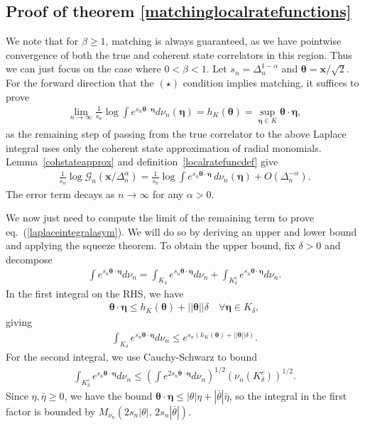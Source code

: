 \documentclass[a4paper,11pt]{article}
\theoremstyle{plain}
\theoremstyle{definition}
\theoremstyle{remark}
\newcommand{\bs}[1]{\boldsymbol{#1}}
\newcommand{\ba}{\begin{equation} \begin{aligned}}
\newcommand{\ea}{\end{aligned} \end{equation}}
\newcommand{\De}{\Delta}
\begin{document}
\begin{appendix}
\section{Proof of theorem \ref{matchinglocalratefunctions}}
\label{proofofmatchinglocalratefunctions}

We note that for $\beta \geq1$, matching is always guaranteed, as we have pointwise convergence of both the true and coherent state correlators in this region. Thus we can just focus on the case where $0<\beta<1$. Let $s_n = \De_n^{1-\alpha}$ and $\bs{\theta} = \bs{x}/\sqrt{2}$. For the forward direction that the $(\star)$ condition implies matching, it suffices to prove
\ba
\lim_{n\to\infty} \frac{1}{s_n} \log \int e^{s_n \bs{\theta}\cdot \bs{\eta}}d\nu_n(\bs{\eta}) = h_K(\bs{\theta}) = \sup_{\bs{\eta}\in K} \bs{\theta} \cdot \bs{\eta},
\label{laplaceintegralasym}
\ea
as the remaining step of passing from the true correlator to the above Laplace integral uses only the coherent state approximation of radial monomials. Lemma~\ref{cohstateapprox} and definition~\ref{localratefuncdef} give
\ba
\frac{1}{s_n}\log\mathcal{G}_n(\bs{x}/\De_n^\alpha) = \frac{1}{s_n}\log\int e^{s_n\bs{\theta}\cdot\bs{\eta}}\,d\nu_n(\bs{\eta}) + O(\De_n^{-\alpha}).
\ea
The error term decays as $n \to \infty$ for any $\alpha > 0$. 

We now just need to compute the limit of the remaining term to prove eq.~(\ref{laplaceintegralasym}). We will do so by deriving an upper and lower bound and applying the squeeze theorem. To obtain the upper bound, fix $\delta> 0$ and decompose
\ba
\int e^{s_n \bs{\theta}\cdot\bs{\eta} }d\nu_n = \int_{K_\delta} e^{s_n \bs{\theta}\cdot \bs{\eta}} d\nu_n + \int_{K_\delta^c} e^{s_n \bs{\theta}\cdot\bs{\eta}} d\nu_n.
\ea
In the first integral on the RHS, we have 
\ba
\bs{\theta} \cdot\bs{\eta} \leq h_K(\bs{\theta}) + ||\bs{\theta}||\delta \quad \forall \bs{\eta} \in K_\delta,
\ea
giving
\ba
\int_{K_\delta} e^{s_n \bs{\theta}\cdot \bs{\eta}} d\nu_n \leq e^{s_n(h_K(\bs{\theta}) + ||\bs{\theta}||\delta)}.
\ea
For the second integral, we use Cauchy-Schwarz to bound
\ba
\int_{K_\delta^c} e^{s_n \bs{\theta}\cdot\bs{\eta}} d\nu_n \leq \left(  \int e^{2 s_n \bs{\theta} \cdot \bs{\eta}} d\nu_n\right)^{1/2} \left( \nu_n(K_\delta^c)\right)^{1/2}.
\ea
Since $\eta,\bar{\eta}\geq 0$, we have the bound $\bs{\theta}\cdot\bs{\eta} \leq |\theta|\eta + |\bar{\theta}|\bar{\eta}$, so the integral in the first factor is bounded by $M_{\nu_n}(2s_n|\theta|,\,2s_n|\bar{\theta}|)$. 


\end{appendix}
\end{document}
